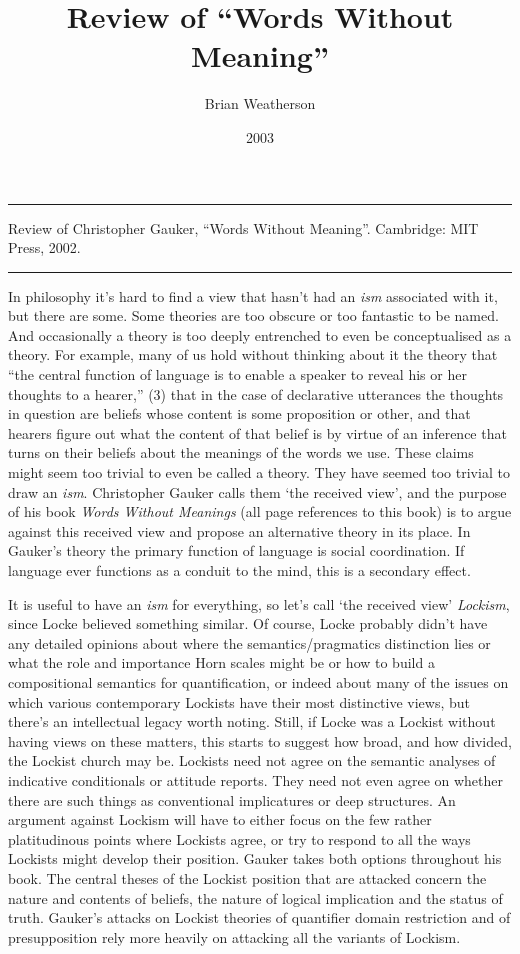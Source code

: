 \documentclass[
  10pt,
  letterpaper,
  DIV=11,
  numbers=noendperiod,
  twoside]{scrartcl}
\title{Review of ``Words Without Meaning''}
\author{Brian Weatherson}
\date{2003}
\renewenvironment{abstract}
 {\vspace{-1.25cm}
 \quotation\small\noindent\rule{\linewidth}{.5pt}\par\smallskip
 \noindent }
 {\par\noindent\rule{\linewidth}{.5pt}\endquotation}
\begin{document}
\maketitle
\begin{abstract}
Review of Christopher Gauker, ``Words Without Meaning''. Cambridge: MIT
Press, 2002.
\end{abstract}


In philosophy it's hard to find a view that hasn't had an \emph{ism}
associated with it, but there are some. Some theories are too obscure or
too fantastic to be named. And occasionally a theory is too deeply
entrenched to even be conceptualised as a theory. For example, many of
us hold without thinking about it the theory that ``the central function
of language is to enable a speaker to reveal his or her thoughts to a
hearer,'' (3) that in the case of declarative utterances the thoughts in
question are beliefs whose content is some proposition or other, and
that hearers figure out what the content of that belief is by virtue of
an inference that turns on their beliefs about the meanings of the words
we use. These claims might seem too trivial to even be called a theory.
They have seemed too trivial to draw an \emph{ism}. Christopher Gauker
calls them `the received view', and the purpose of his book \emph{Words
Without Meanings} (all page references to this book) is to argue against
this received view and propose an alternative theory in its place. In
Gauker's theory the primary function of language is social coordination.
If language ever functions as a conduit to the mind, this is a secondary
effect.

It is useful to have an \emph{ism} for everything, so let's call `the
received view' \emph{Lockism}, since Locke believed something similar.
Of course, Locke probably didn't have any detailed opinions about where
the semantics/pragmatics distinction lies or what the role and
importance Horn scales might be or how to build a compositional
semantics for quantification, or indeed about many of the issues on
which various contemporary Lockists have their most distinctive views,
but there's an intellectual legacy worth noting. Still, if Locke was a
Lockist without having views on these matters, this starts to suggest
how broad, and how divided, the Lockist church may be. Lockists need not
agree on the semantic analyses of indicative conditionals or attitude
reports. They need not even agree on whether there are such things as
conventional implicatures or deep structures. An argument against
Lockism will have to either focus on the few rather platitudinous points
where Lockists agree, or try to respond to all the ways Lockists might
develop their position. Gauker takes both options throughout his book.
The central theses of the Lockist position that are attacked concern the
nature and contents of beliefs, the nature of logical implication and
the status of truth. Gauker's attacks on Lockist theories of quantifier
domain restriction and of presupposition rely more heavily on attacking
all the variants of Lockism.
\end{document}
